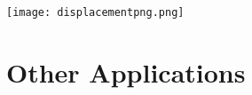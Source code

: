\documentclass[12pt,fleqn]{book} %
\begin{document}
\pagebreak


\begin{multicols}{2}
    \texttt{[image: displacementpng.png]}
    \columnbreak

    

\end{multicols}


\section{Other Applications}

\begin{center}

\end{center}

\vspace*{-3mm}

\pagebreak

\begin{center}

\end{center}
\end{document}
